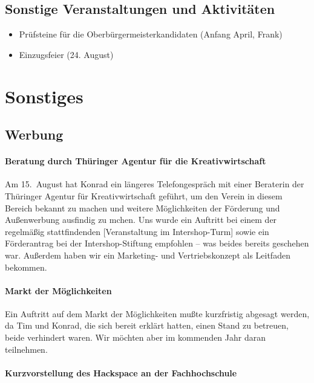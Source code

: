 \documentclass[10pt,DIV16]{scrartcl}
\begin{document}
\subsection{Sonstige Veranstaltungen und Aktivitäten}

\begin{itemize}
	\item Prüfsteine für die Oberbürgermeisterkandidaten (Anfang April, Frank)
	\item Einzugsfeier (24. August)
\end{itemize}


\section{Sonstiges}

\subsection{Werbung}

\paragraph{Beratung durch Thüringer Agentur für die Kreativwirtschaft}

Am 15.~August hat Konrad ein längeres Telefongespräch mit einer Beraterin der
Thüringer Agentur für Kreativwirtschaft geführt, um den Verein in diesem
Bereich bekannt zu machen und weitere Möglichkeiten der Förderung und
Außenwerbung ausfindig zu mchen.  Uns wurde ein Auftritt bei einem der
regelmäßig stattfindenden [Veranstaltung im Intershop-Turm] sowie ein
Förderantrag bei der Intershop-Stiftung empfohlen -- was beides bereits
geschehen war.  Außerdem haben wir ein Marketing- und Vertriebskonzept als
Leitfaden bekommen.

\paragraph{Markt der Möglichkeiten}

Ein Auftritt auf dem Markt der Möglichkeiten mußte kurzfristig abgesagt
werden, da Tim und Konrad, die sich bereit erklärt hatten, einen Stand zu
betreuen, beide verhindert waren.  Wir möchten aber im kommenden Jahr daran
teilnehmen.

\paragraph{Kurzvorstellung des Hackspace an der Fachhochschule}
\end{document}
